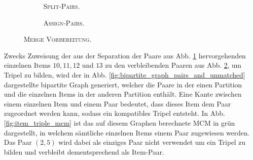 \begin{figure}[H]
\centering
\begin{subfigure}[b]{\textwidth}
\centering
{}
\caption{\textsc{Split-Pairs}.}
\label{fig:split_pairs}
\end{subfigure}
\begin{subfigure}[b]{\textwidth}
\centering
{}
\caption{\textsc{Assign-Pairs}.}
\label{fig:assign_pairs}
\end{subfigure}
\caption{\textsc{Merge Vorbereitung}.}
\label{fig:pre_merge_step}
\end{figure}

Zwecks Zuweisung der aus der Separation der Paare aus Abb. \ref{fig:split_pairs} hervorgehenden einzelnen Items $10, 11, 12$ und $13$
zu den verbleibenden Paaren aus Abb. \ref{fig:assign_pairs}, um Tripel zu bilden, wird der in Abb.
\ref{fig:bipartite_graph_pairs_and_unmatched} dargestellte bipartite Graph generiert, welcher die Paare in der einen Partition
und die einzelnen Items in der anderen Partition enthält. Eine Kante zwischen einem einzelnen Item und einem Paar bedeutet,
dass dieses Item dem Paar zugeordnet werden kann, sodass ein kompatibles Tripel entsteht.
In Abb. \ref{fig:item_triple_mcm} ist das auf diesem Graphen berechnete \textsc{MCM} in grün dargestellt, in welchem
sämtliche einzelnen Items einem Paar zugewiesen werden. Das Paar $(2, 5)$ wird dabei als einziges Paar nicht verwendet
um ein Tripel zu bilden und verbleibt dementsprechend als Item-Paar.

